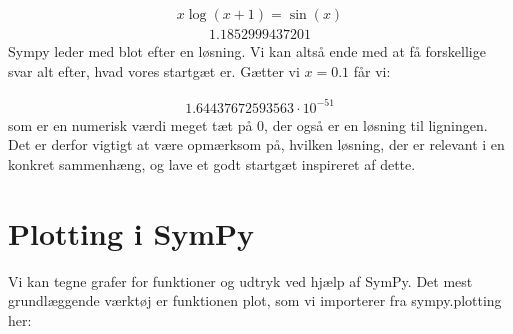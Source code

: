 \documentclass[letterpaper,10pt,english]{jupyterBook}
\begin{document}
\begin{sphinxVerbatim}[commandchars=\\\{\}]
       
  
\end{sphinxVerbatim}
\begin{equation*}
\begin{split}\displaystyle x \log{\left(x + 1 \right)} = \sin{\left(x \right)}\end{split}
\end{equation*}\begin{equation*}
\begin{split}\displaystyle 1.1852999437201\end{split}
\end{equation*}
Sympy leder med  blot efter en løsning. Vi kan altså ende med at få forskellige svar alt efter, hvad vores startgæt er. Gætter vi \(x = 0.1\) får vi:

\begin{sphinxVerbatim}[commandchars=\\\{\}]
  
\end{sphinxVerbatim}
\begin{equation*}
\begin{split}\displaystyle 1.64437672593563 \cdot 10^{-51}\end{split}
\end{equation*}
som er en numerisk værdi meget tæt på 0, der også er en løsning til ligningen. Det er derfor vigtigt at være opmærksom på, hvilken løsning, der er relevant i en konkret sammenhæng, og lave et godt startgæt inspireret af dette.


\section{Plotting i SymPy}
\label{\detokenize{notebooks/sympy/Notebook3_plot:plotting-i-sympy}}\label{\detokenize{notebooks/sympy/Notebook3_plot::doc}}
Vi kan tegne grafer for funktioner og udtryk ved hjælp af SymPy. Det mest grundlæggende værktøj er funktionen plot, som vi importerer fra sympy.plotting her:
\end{document}

